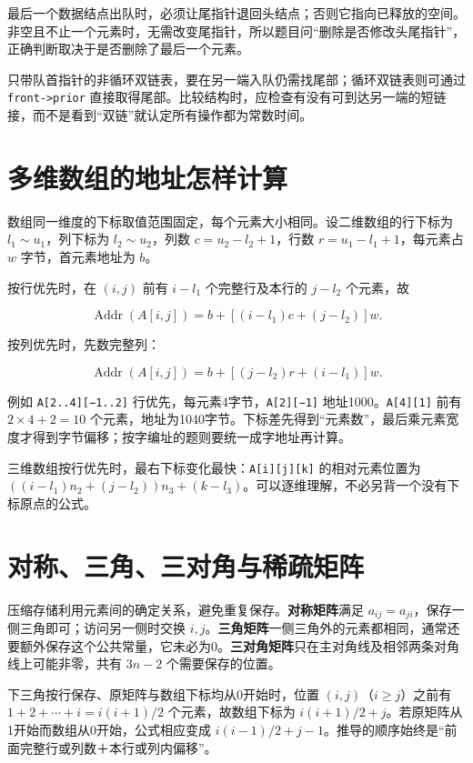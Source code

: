 最后一个数据结点出队时，必须让尾指针退回头结点；否则它指向已释放的空间。非空且不止一个元素时，无需改变尾指针，所以题目问``删除是否修改头尾指针''，正确判断取决于是否删除了最后一个元素。

只带队首指针的非循环双链表，要在另一端入队仍需找尾部；循环双链表则可通过 \allowbreak{}\texttt{front-\textgreater{}prior} 直接取得尾部。比较结构时，应检查有没有可到达另一端的短链接，而不是看到``双链''就认定所有操作都为常数时间。

\section{多维数组的地址怎样计算}\label{ds-03-05}

数组同一维度的下标取值范围固定，每个元素大小相同。设二维数组的行下标为 \(l_1\sim u_1\)，列下标为 \(l_2\sim u_2\)，列数 \(c=u_2-l_2+1\)，行数 \(r=u_1-l_1+1\)，每元素占 \(w\) 字节，首元素地址为 \(b\)。

按行优先时，在 \((i,j)\) 前有 \(i-l_1\) 个完整行及本行的 \(j-l_2\) 个元素，故

\[\operatorname{Addr}(A[i,j])=b+[(i-l_1)c+(j-l_2)]w.\]

按列优先时，先数完整列：

\[\operatorname{Addr}(A[i,j])=b+[(j-l_2)r+(i-l_1)]w.\]

例如 \allowbreak{}\texttt{A{[}2..4{]}{[}−1..2{]}} 行优先，每元素4字节，\allowbreak{}\texttt{A{[}2{]}{[}−1{]}} 地址1000。\allowbreak{}\texttt{A{[}4{]}{[}1{]}} 前有 \(2\times4+2=10\) 个元素，地址为1040字节。下标差先得到``元素数''，最后乘元素宽度才得到字节偏移；按字编址的题则要统一成字地址再计算。

三维数组按行优先时，最右下标变化最快：\allowbreak{}\texttt{A{[}i{]}{[}j{]}{[}k{]}} 的相对元素位置为 \(((i-l_1)n_2+(j-l_2))n_3+(k-l_3)\)。可以逐维理解，不必另背一个没有下标原点的公式。

\section{对称、三角、三对角与稀疏矩阵}\label{ds-03-06}

压缩存储利用元素间的确定关系，避免重复保存。\textbf{对称矩阵}满足 \(a_{ij}=a_{ji}\)，保存一侧三角即可；访问另一侧时交换 \(i,j\)。\textbf{三角矩阵}一侧三角外的元素都相同，通常还要额外保存这个公共常量，它未必为0。\textbf{三对角矩阵}只在主对角线及相邻两条对角线上可能非零，共有 \(3n-2\) 个需要保存的位置。

下三角按行保存、原矩阵与数组下标均从0开始时，位置 \((i,j)\)（\(i\ge j\)）之前有 \(1+2+\cdots+i=i(i+1)/2\) 个元素，故数组下标为 \(i(i+1)/2+j\)。若原矩阵从1开始而数组从0开始，公式相应变成 \(i(i-1)/2+j-1\)。推导的顺序始终是``前面完整行或列数＋本行或列内偏移''。

